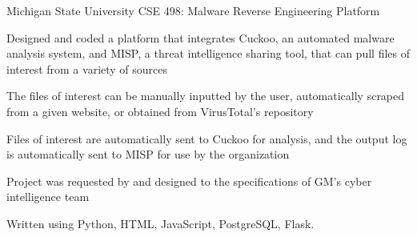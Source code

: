 
\begin{cventries}
  \cventry
    {Michigan State University}
    {CSE 498: Malware Reverse Engineering Platform}
    {}
    {}
    {
      \begin{cvitems} %
		    \item {Designed and coded a platform that integrates Cuckoo, an automated malware analysis system, and MISP, a threat intelligence sharing tool, that can pull files of interest from a variety of sources}
		    \item {The files of interest can be manually inputted by the user, automatically scraped from a given website, or obtained from VirusTotal's repository}
		    \item {Files of interest are automatically sent to Cuckoo for analysis, and the output log is automatically sent to MISP for use by the organization}
		    \item {Project was requested by and designed to the specifications of GM's cyber intelligence team}
        \item {Written using Python, HTML, JavaScript, PostgreSQL, Flask.}
      \end{cvitems}
    }
\end{cventries}